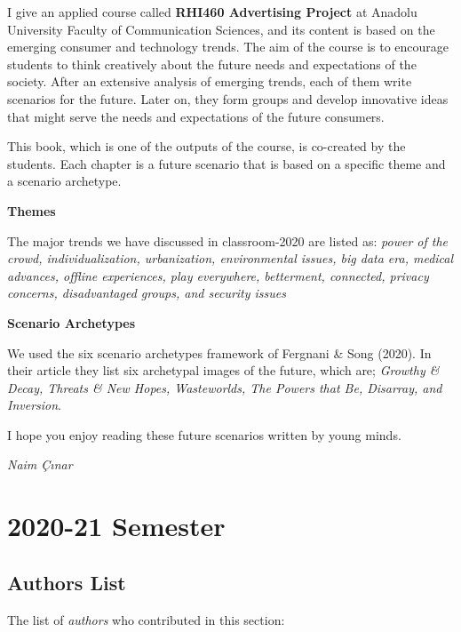 \documentclass[]{book}
\begin{document}
I give an applied course called \textbf{RHI460 Advertising Project} at Anadolu University Faculty of Communication Sciences, and its content is based on the emerging consumer and technology trends. The aim of the course is to encourage students to think creatively about the future needs and expectations of the society. After an extensive analysis of emerging trends, each of them write scenarios for the future. Later on, they form groups and develop innovative ideas that might serve the needs and expectations of the future consumers.

This book, which is one of the outputs of the course, is co-created by the students. Each chapter is a future scenario that is based on a specific theme and a scenario archetype.

\textbf{Themes}

The major trends we have discussed in classroom-2020 are listed as: \emph{power of the crowd, individualization, urbanization, environmental issues, big data era, medical advances, offline experiences, play everywhere, betterment, connected, privacy concerns, disadvantaged groups, and security issues}

\textbf{Scenario Archetypes}

We used the six scenario archetypes framework of Fergnani \& Song (2020). In their article they list six archetypal images of the future, which are; \emph{Growthy \& Decay, Threats \& New Hopes, Wasteworlds, The Powers that Be, Disarray, and Inversion}.

I hope you enjoy reading these future scenarios written by young minds.

\emph{Naim Çınar}

\hypertarget{part-2020-21-semester}{%
\part*{2020-21 Semester}\label{part-2020-21-semester}}

\hypertarget{section-id}{%
\chapter*{Authors List}\label{section-id}}

The list of \emph{authors} who contributed in this section:
\end{document}
